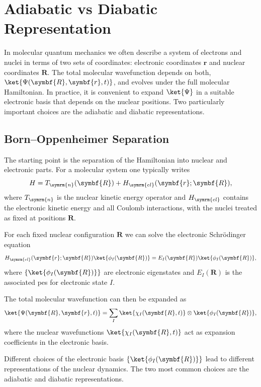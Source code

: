 \section{Adiabatic vs Diabatic Representation}\label{sec:adiabatic_vs_diabatic_representation}
In molecular quantum mechanics we often describe a system of electrons and nuclei in terms of two sets of coordinates: electronic coordinates $\symbf{r}$ and nuclear coordinates $\symbf{R}$. The total molecular wavefunction depends on both, $\ket{\Psi(\symbf{R},\symbf{r},t)}$, and evolves under the full molecular Hamiltonian. In practice, it is convenient to expand $\ket{\Psi}$ in a suitable electronic basis that depends on the nuclear positions. Two particularly important choices are the adiabatic and diabatic representations.
\subsection{Born--Oppenheimer Separation}\label{sec:born_oppenheimer_separation}
The starting point is the separation of the Hamiltonian into nuclear and electronic parts. For a molecular system one typically writes
\begin{equation}\label{eq:boa_hamiltonian}
H=T_{\symrm{n}}(\symbf{R})+H_{\symrm{el}}(\symbf{r};\symbf{R}),
\end{equation}
where $T_{\symrm{n}}$ is the nuclear kinetic energy operator and $H_{\symrm{el}}$ contains the electronic kinetic energy and all Coulomb interactions, with the nuclei treated as fixed at positions $\symbf{R}$.

For each fixed nuclear configuration $\symbf{R}$ we can solve the electronic Schr\"odinger equation
\begin{equation}
H_{\symrm{el}}(\symbf{r};\symbf{R})\ket{\phi_I(\symbf{R})}=E_I(\symbf{R})\ket{\phi_I(\symbf{R})},
\end{equation}
where $\{\ket{\phi_I(\symbf{R})}\}$ are electronic eigenstates and $E_I(\symbf{R})$ is the associated \acrfull{pes} for electronic state $I$.

The total molecular wavefunction can then be expanded as
\begin{equation}\label{eq:boa_expansion}
\ket{\Psi(\symbf{R},\symbf{r},t)}=\sum_I\ket{\chi_I(\symbf{R},t)}\otimes\ket{\phi_I(\symbf{R})},
\end{equation}
where the nuclear wavefunctions $\ket{\chi_I(\symbf{R},t)}$ act as expansion coefficients in the electronic basis.

Different choices of the electronic basis $\{\ket{\phi_I(\symbf{R})}\}$ lead to different representations of the nuclear dynamics. The two most common choices are the adiabatic and diabatic representations.
